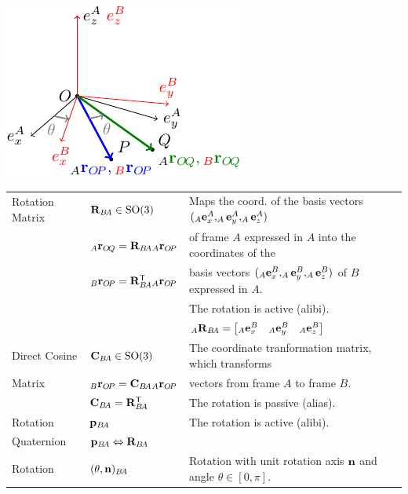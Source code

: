 \documentclass[10pt,landscape,a4paper]{article}
\newcommand\transpose{\mathsf{T}}
\newcommand\pos[3]{{}_#1\vr_{#2\!#3}}
\newcommand\rotmat[2]{\vR_{#1\!#2}}
\newcommand\comat[2]{\vC_{#1\!#2}}
\newcommand\quat[2]{\vp_{#1\!#2}}
\newcommand\angleaxis[2]{(\theta,\vn)_{#1\!#2}}
\begin{document}
\begin{multicols}{2}
{\begin{tabular}[h!]{r@{ }p{3cm}@{ }l@{ }}
\end{tabular}
}
\parbox[t]{0.25\columnwidth}{\null
\vspace{-5mm}
        \includegraphics[width=0.25\columnwidth]{coordinate_systems/rotation_active_passive-crop.pdf}
}

\begin{tabular}{|l|l@{}|l@{}|}
\hline
Rotation Matrix &  $\rotmat{B}{A} \in \mathrm{SO}(3)$ & Maps the coord. of the basis vectors $(_A\mathbf e_x^A, _A\mathbf e_y^A, _A\mathbf e_z^A)$ \\
 & $ \pos{A}{O}{Q} = \rotmat{B}{A} \pos{A}{O}{P}$ & of frame $A$ expressed in $A$  into the coordinates of the  \\
& $ \pos{B}{O}{P} = \rotmat{B}{A}^\transpose \pos{A}{O}{P}$ & basis vectors $(_A\mathbf e_x^B, _A\mathbf e_y^B, _A\mathbf e_z^B)$ of $B$ expressed in $A$. \\ 
 & &  The rotation is active (alibi). \\
& & $_A\rotmat{B}{A} = \begin{bmatrix}_A\ve_x^B & _A\ve_y^B & _A\ve_z^B\end{bmatrix}$ \\ \hline
Direct Cosine& $\comat{B}{A} \in \mathrm{SO}(3)$ & The coordinate tranformation matrix, which transforms \\  
 Matrix & $ \pos{B}{O}{P} = \comat{B}{A} \pos{A}{O}{P}$ & vectors from frame $A$ to frame $B$. \\
& $\comat{B}{A} = \rotmat{B}{A}^\transpose$ & The rotation is passive (alias). \\  \hline 
 Rotation  & $\quat{B}{A}$ & The rotation is active (alibi). \\
Quaternion &   $\quat{B}{A} \Leftrightarrow \rotmat{B}{A} $ &  \\ \hline
Rotation & $\angleaxis{B}{A}$ &   Rotation with unit rotation axis $\mathbf n$ and angle $\theta \in [0, \pi]$. \\

\end{tabular}
\end{multicols}
\end{document}
